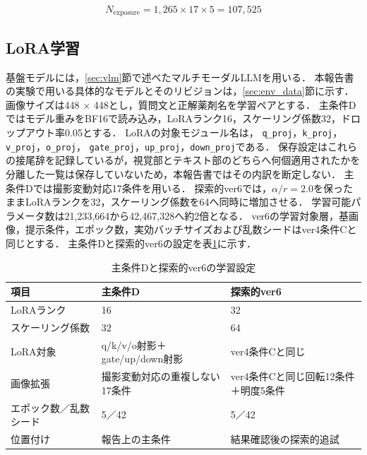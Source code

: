 \documentclass[uplatex,dvipdfmx]{jsarticle}
\begin{document}
\begin{equation}
  N_{\mathrm{exposure}} = 1,265 \times 17 \times 5 = 107,525
  \label{eq:exposure}
\end{equation}

\subsection{LoRA学習}

基盤モデルには，\ref{sec:vlm}節で述べたマルチモーダルLLMを用いる．
本報告書の実験で用いる具体的なモデルとそのリビジョンは，\ref{sec:env_data}節に示す．
画像サイズは448 $\times$ 448とし，質問文と正解薬剤名を学習ペアとする．
主条件Dではモデル重みをBF16で読み込み，LoRAランク16，スケーリング係数32，ドロップアウト率0.05とする．
LoRAの対象モジュール名は，
\texttt{q\_proj}，\texttt{k\_proj}，\texttt{v\_proj}，\texttt{o\_proj}，
\texttt{gate\_proj}，\texttt{up\_proj}，\texttt{down\_proj}である．
保存設定はこれらの接尾辞を記録しているが，視覚部とテキスト部のどちらへ何個適用されたかを
分離した一覧は保存していないため，本報告書ではその内訳を断定しない．
主条件Dでは撮影変動対応17条件を用いる．
探索的ver6では，$\alpha/r=2.0$を保ったままLoRAランクを32，スケーリング係数を64へ同時に増加させる．
学習可能パラメータ数は21,233,664から42,467,328へ約2倍となる．
ver6の学習対象層，基画像，提示条件，エポック数，実効バッチサイズおよび乱数シードはver4条件Cと同じとする．
主条件Dと探索的ver6の設定を表\ref{tab:primary_exploratory_settings}に示す．

\begin{table}[htbp]
  \centering
  \caption{主条件Dと探索的ver6の学習設定}
  \label{tab:primary_exploratory_settings}
  \small
  \begin{tabular}{|p{4.0cm}|p{4.2cm}|p{4.2cm}|}
    \hline
    項目 & 主条件D & 探索的ver6 \\ \hline
    LoRAランク & 16 & 32 \\ \hline
    スケーリング係数 & 32 & 64 \\ \hline
    LoRA対象 & q/k/v/o射影＋gate/up/down射影 & ver4条件Cと同じ \\ \hline
    画像拡張 & 撮影変動対応の重複しない17条件 & ver4条件Cと同じ回転12条件＋明度5条件 \\ \hline
    エポック数／乱数シード & 5／42 & 5／42 \\ \hline
    位置付け & 報告上の主条件 & 結果確認後の探索的追試 \\ \hline
  \end{tabular}
\end{table}
\end{document}
